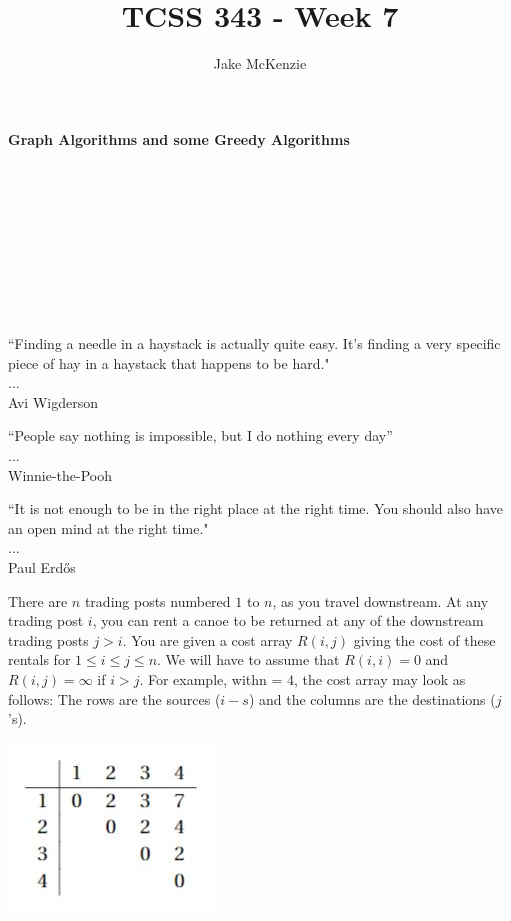 \documentclass[12pt]{article}
\begin{document}
\title{TCSS 343 - Week 7}
\author{Jake McKenzie}
\maketitle
\noindent\centerline{\textbf{Graph Algorithms and some Greedy Algorithms}}\\\\\\\\\\\\\\\\
\begin{center}
    ``Finding a needle in a haystack is actually quite easy. It's finding a very specific piece of hay in a haystack that happens to be hard." \\$\dots$\\ Avi Wigderson
\end{center}
\begin{center}
    ``People say nothing is impossible, but I do nothing every day'' \\$\dots$\\ Winnie-the-Pooh
\end{center}
\begin{center}
    ``It is not enough to be in the right place at the right time. You should also have an open mind at the right time." \\$\dots$\\ Paul Erd\H{o}s
\end{center}
\newpage
\noindent There are $n$ trading posts numbered $1$ to $n$, 
as you travel downstream. At any trading post $i$, you can rent 
a canoe to be returned at any of the downstream trading posts $j > i$. 
You are given a cost array $R(i,j)$ giving the cost of these rentals for 
$1 \leq i \leq j \leq n$. We will have to assume that $R(i,i) = 0$ and $R(i,j) = \infty$ 
if $i > j$. For example, withn = $4$, the cost array may look as follows: The rows are the 
sources ($i - s$) and the columns are the destinations ($j$’s).\\
\centerline{\includegraphics[scale = .8]{posts.jpg}}\\
\end{document}
